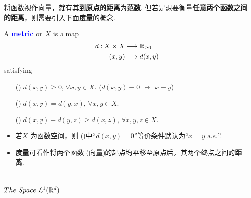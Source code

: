  	\newpage
 	将函数视作向量，就有其\textbf{到原点的距离}为\textbf{范数}. 但若是想要衡量\textbf{任意两个函数之间的距离}，则需要引入下面\textbf{度量}的概念.
 	\begin{defn}\label{def 3.2.2}
 		A \underline{\textcolor{blue}{\textbf{metric}}} on $X$ is a map
 		\begin{align}
 			d : X \times X &\longrightarrow \mathbb{R}_{\geq 0} \\
 			(x , y) &\longmapsto d(x , y)
 		\end{align}
 		satisfying
 		\begin{enumerate}
 			\item[(\rmnum{1})]$d(x,  y) \geq 0$, $\forall x , y \in X$. \hspace*{3em} ($d(x , y) = 0 \,\, \Leftrightarrow \,\, x = y$)
 			
 			\item[(\rmnum{2})]$d(x , y) = d(y , x)$, $\forall x , y \in X$.
 			
 			\item[(\rmnum{3})]$d(x , y) + d(y , z) \geq d(x , z)$, $\forall x , y , z \in X$.
 		\end{enumerate}
 		
 		\vspace{2em}
 		\begin{rmk}
 			\begin{itemize}
 				\item 若$X$ 为函数空间，则 ()中“$d(x , y) = 0$”等价条件默认为“$x = y \,\, a.e.$”.
 				
 				\vspace{1em}
 				
 				\item \textbf{度量}可看作将两个函数 (向量)的起点均平移至原点后，其两个终点之间的\textbf{距离}.
 			\end{itemize}
 		\end{rmk}
 	\end{defn}
 
\vspace{2em}
\subsection{$The \,\, Space \,\, \mathcal{L}^{1}(\mathbb{R}^d)$}
